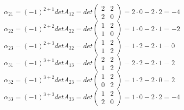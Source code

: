 $\alpha_{21}=(-1)^{2+1}detA_{12}=det\begin{pmatrix}2&2\\2&0\end{pmatrix}=2\cdot 0 - 2\cdot2=-4$ \newline
$\alpha_{22}=(-1)^{2+2}detA_{22}=det\begin{pmatrix}1&2\\1&0\end{pmatrix}=1\cdot 0 - 2\cdot1=-2$ \newline
$\alpha_{23}=(-1)^{2+3}detA_{32}=det\begin{pmatrix}1&2\\1&2\end{pmatrix}=1\cdot 2 - 2\cdot1=0$ \newline
$\alpha_{31}=(-1)^{3+1}detA_{13}=det\begin{pmatrix}2&2\\1&2\end{pmatrix}=2\cdot 2 - 2\cdot1=2$ \newline
$\alpha_{32}=(-1)^{3+2}detA_{23}=det\begin{pmatrix}1&2\\0&2\end{pmatrix}=1\cdot 2 - 2\cdot0=2$ \newline
$\alpha_{33}=(-1)^{3+3}detA_{33}=det\begin{pmatrix}1&2\\2&0\end{pmatrix}=1\cdot 0 - 2\cdot2=-4$ \newline